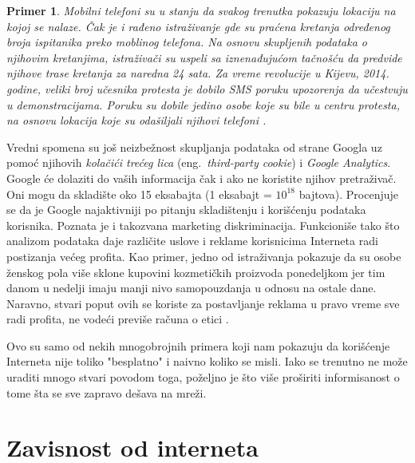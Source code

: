 \documentclass[a4paper]{article}
\newtheorem{primer}{Primer}[section]
\begin{document}
\begin{primer}
Mobilni telefoni su u stanju da svakog trenutka pokazuju lokaciju na kojoj se nalaze. Čak je i rađeno istraživanje gde su praćena kretanja određenog broja ispitanika preko moblinog telefona. Na osnovu skupljenih podataka o njihovim kretanjima, istraživači su uspeli sa iznenađujućom tačnošću da predvide njihove trase kretanja za naredna 24 sata. Za vreme revolucije u Kijevu, 2014. godine, veliki broj učesnika protesta je dobilo SMS poruku upozorenja da učestvuju u demonstracijama. Poruku su dobile jedino osobe koje su bile u centru protesta, na osnovu lokacija koje su odašiljali njihovi telefoni \cite{dataAndGoliath}.
\end{primer}

	Vredni spomena su još neizbežnost skupljanja podataka od strane Googla uz pomoć njihovih {\em kolačići trećeg lica} (eng.~{\em third-party cookie}) i \textit{Google Analytics}. Google će dolaziti do vaših informacija čak i ako ne koristite njihov pretraživač. Oni mogu da skladište oko 15 eksabajta (1 eksabajt = $10^{18}$ bajtova). Procenjuje se da je Google najaktivniji po pitanju skladištenju i korišćenju podataka korisnika. Poznata je i takozvana marketing diskriminacija. Funkcioniše tako što analizom podataka daje različite uslove i reklame korisnicima Interneta radi postizanja većeg profita. Kao primer, jedno od istraživanja pokazuje da su osobe ženskog pola više sklone kupovini kozmetičkih proizvoda ponedeljkom jer tim danom u nedelji imaju manji nivo samopouzdanja u odnosu na ostale dane. Naravno, stvari poput ovih se koriste za postavljanje reklama u pravo vreme sve radi profita, ne vodeći previše računa o etici \cite{dataAndGoliath}\cite{theNetDelusion}.

	Ovo su samo od nekih mnogobrojnih primera koji nam pokazuju da korišćenje Interneta nije toliko "besplatno" i naivno koliko se misli. Iako se trenutno ne može uraditi mnogo stvari povodom toga, poželjno je što više proširiti informisanost o tome šta se sve zapravo dešava na mreži.

\section{Zavisnost od interneta}
\end{document}
